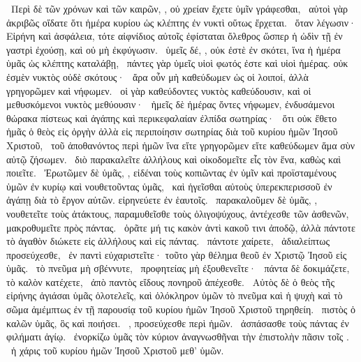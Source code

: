 ~Περὶ δὲ τῶν χρόνων καὶ τῶν καιρῶν, , οὐ χρείαν ἔχετε ὑμῖν γράφεσθαι,
~αὐτοὶ γὰρ ἀκριβῶς οἴδατε ὅτι ἡμέρα κυρίου ὡς κλέπτης ἐν νυκτὶ οὕτως ἔρχεται.
~ὅταν λέγωσιν· Εἰρήνη καὶ ἀσφάλεια, τότε αἰφνίδιος αὐτοῖς ἐφίσταται ὄλεθρος ὥσπερ ἡ ὠδὶν τῇ ἐν γαστρὶ ἐχούσῃ, καὶ οὐ μὴ ἐκφύγωσιν.
~ὑμεῖς δέ, , οὐκ ἐστὲ ἐν σκότει, ἵνα ἡ ἡμέρα ὑμᾶς ὡς κλέπτης καταλάβῃ,
~πάντες γὰρ ὑμεῖς υἱοὶ φωτός ἐστε καὶ υἱοὶ ἡμέρας. οὐκ ἐσμὲν νυκτὸς οὐδὲ σκότους·
~ἄρα οὖν μὴ καθεύδωμεν ὡς οἱ λοιποί, ἀλλὰ γρηγορῶμεν καὶ νήφωμεν.
~οἱ γὰρ καθεύδοντες νυκτὸς καθεύδουσιν, καὶ οἱ μεθυσκόμενοι νυκτὸς μεθύουσιν·
~ἡμεῖς δὲ ἡμέρας ὄντες νήφωμεν, ἐνδυσάμενοι θώρακα πίστεως καὶ ἀγάπης καὶ περικεφαλαίαν ἐλπίδα σωτηρίας·
~ὅτι οὐκ ἔθετο ἡμᾶς ὁ θεὸς εἰς ὀργὴν ἀλλὰ εἰς περιποίησιν σωτηρίας διὰ τοῦ κυρίου ἡμῶν Ἰησοῦ Χριστοῦ,
~τοῦ ἀποθανόντος περὶ ἡμῶν ἵνα εἴτε γρηγορῶμεν εἴτε καθεύδωμεν ἅμα σὺν αὐτῷ ζήσωμεν.
~διὸ παρακαλεῖτε ἀλλήλους καὶ οἰκοδομεῖτε εἷς τὸν ἕνα, καθὼς καὶ ποιεῖτε.
~Ἐρωτῶμεν δὲ ὑμᾶς, , εἰδέναι τοὺς κοπιῶντας ἐν ὑμῖν καὶ προϊσταμένους ὑμῶν ἐν κυρίῳ καὶ νουθετοῦντας ὑμᾶς,
~καὶ ἡγεῖσθαι αὐτοὺς ὑπερεκπερισσοῦ ἐν ἀγάπῃ διὰ τὸ ἔργον αὐτῶν. εἰρηνεύετε ἐν ἑαυτοῖς.
~παρακαλοῦμεν δὲ ὑμᾶς, , νουθετεῖτε τοὺς ἀτάκτους, παραμυθεῖσθε τοὺς ὀλιγοψύχους, ἀντέχεσθε τῶν ἀσθενῶν, μακροθυμεῖτε πρὸς πάντας.
~ὁρᾶτε μή τις κακὸν ἀντὶ κακοῦ τινι ἀποδῷ, ἀλλὰ πάντοτε τὸ ἀγαθὸν διώκετε εἰς ἀλλήλους καὶ εἰς πάντας.
~πάντοτε χαίρετε,
~ἀδιαλείπτως προσεύχεσθε,
~ἐν παντὶ εὐχαριστεῖτε· τοῦτο γὰρ θέλημα θεοῦ ἐν Χριστῷ Ἰησοῦ εἰς ὑμᾶς.
~τὸ πνεῦμα μὴ σβέννυτε,
~προφητείας μὴ ἐξουθενεῖτε·
~πάντα δὲ δοκιμάζετε, τὸ καλὸν κατέχετε,
~ἀπὸ παντὸς εἴδους πονηροῦ ἀπέχεσθε.
~Αὐτὸς δὲ ὁ θεὸς τῆς εἰρήνης ἁγιάσαι ὑμᾶς ὁλοτελεῖς, καὶ ὁλόκληρον ὑμῶν τὸ πνεῦμα καὶ ἡ ψυχὴ καὶ τὸ σῶμα ἀμέμπτως ἐν τῇ παρουσίᾳ τοῦ κυρίου ἡμῶν Ἰησοῦ Χριστοῦ τηρηθείη.
~πιστὸς ὁ καλῶν ὑμᾶς, ὃς καὶ ποιήσει.
~, προσεύχεσθε περὶ ἡμῶν.
~ἀσπάσασθε τοὺς  πάντας ἐν φιλήματι ἁγίῳ.
~ἐνορκίζω ὑμᾶς τὸν κύριον ἀναγνωσθῆναι τὴν ἐπιστολὴν πᾶσιν τοῖς .
~ἡ χάρις τοῦ κυρίου ἡμῶν Ἰησοῦ Χριστοῦ μεθ’ ὑμῶν.


